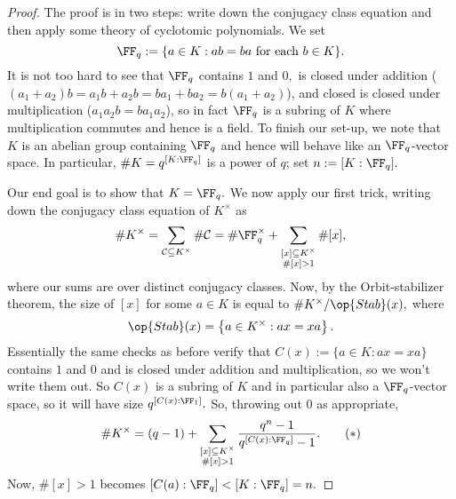 \documentclass[../notes.tex]{subfiles}
\begin{document}
\begin{proof}
	The proof is in two steps: write down the conjugacy class equation and then apply some theory of cyclotomic polynomials.
	We set
	\[\FF_q:=\{a\in K:ab=ba\text{ for each }b\in K\}.\]
	It is not too hard to see that $\FF_q$ contains $1$ and $0,$ is closed under addition ($(a_1+a_2)b=a_1b+a_2b=ba_1+ba_2=b(a_1+a_2)$), and closed is closed under multiplication ($a_1a_2b=ba_1a_2$), so in fact $\FF_q$ is a subring of $K$ where multiplication commutes and hence is a field. To finish our set-up, we note that $K$ is an abelian group containing $\FF_q$ and hence will behave like an $\FF_q$-vector space. In particular, $\#K=q^{[K:\FF_q]}$ is a power of $q$; set $n:=[K:\FF_q].$

	Our end goal is to show that $K=\FF_q.$ We now apply our first trick, writing down the conjugacy class equation of $K^\times$ as
	\[\#K^\times=\sum_{\mathcal C\subseteq K^\times}\#\mathcal C=\#\FF_q^\times+\sum_{\substack{[x]\subseteq K^\times\\\#[x]>1}}\#[x],\]
	where our sums are over distinct conjugacy classes. Now, by the Orbit-stabilizer theorem, the size of $[x]$ for some $a\in K$ is equal to $\#K^\times/\op{Stab}(x),$ where
	\[\op{Stab}(x)=\left\{a\in K^\times:ax=xa\right\}.\]
	Essentially the same checks as before verify that $C(x):=\{a\in K:ax=xa\}$ contains $1$ and $0$ and is closed under addition and multiplication, so we won't write them out. So $C(x)$ is a subring of $K$ and in particular also a $\FF_q$-vector space, so it will have size $q^{[C(x):\FF_1]}.$ So, throwing out $0$ as appropriate,
	\[\#K^\times=(q-1)+\sum_{\substack{[x]\subseteq K^\times\\\#[x]>1}}\frac{q^n-1}{q^{[C(x):\FF_q]}-1}.\tag{$*$}\]
	Now, $\#[x]>1$ becomes $[C(a):\FF_q]<[K:\FF_q]=n.$


\end{proof}
\end{document}
